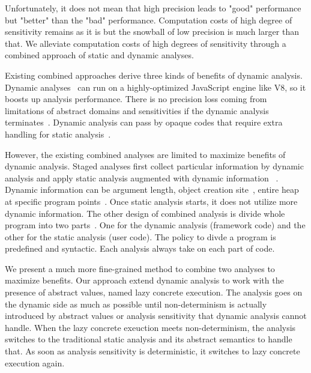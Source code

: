 Unfortunately, it does not mean that high precision leads to "good" performance
but "better" than the "bad" performance.
Computation costs of high degree of sensitivity remains as it is but the
snowball of low precision is much larger than that.
We alleviate computation costs of high degrees of sensitivity through a combined
approach of static and dynamic analyses.


Existing combined approaches derive three kinds of benefits of dynamic analysis.
Dynamic analyses~\cite{jalangi, jalangi2, dlint} can run on a highly-optimized
JavaScript engine like V8, so it boosts up analysis performance.
There is no precision loss coming from limitations of abstract domains and
sensitivities if the dynamic analysis terminates~\cite{concerto}.
Dynamic analysis can pass by opaque codes that require extra handling for static
analysis~\cite{battles, sra}.

However, the existing combined analyses are limited to maximize benefits of
dynamic analysis.
Staged analyses first collect particular information by dynamic analysis and
apply static analysis augmented with dynamic information~\cite{staged, blendedJava, eha} \todo.
Dynamic information can be argument length, object creation site~\cite{blended}, entire heap at
specific program points~\cite{battles}.
Once static analysis starts, it does not utilize more dynamic information.
The other design of combined analysis is divide whole program into two parts~\cite{concerto}.
One for the dynamic analysis (framework code) and the other for the static analysis (user code).
The policy to divde a program is predefined and syntactic.
Each analysis always take on each part of code.


We present a much more fine-grained method to combine two analyses to maximize
benefits.
Our approach extend dynamic analysis to work with the presence of abstract
values, named lazy concrete execution.
The analysis goes on the dynamic side as much as possible until non-determinism
is actually introduced by abstract values or analysis sensitivity that dynamic
analysis cannot handle.
When the lazy concrete exeuction meets non-determinism, the analysis switches to
the traditional static analysis and its abstract semantics to handle that.
As soon as analysis sensitivity is deterministic, it switches to lazy concrete
execution again.

